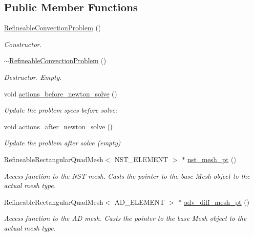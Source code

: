 \subsection*{Public Member Functions}
\begin{DoxyCompactItemize}
\item 
\hyperlink{classRefineableConvectionProblem_a97e661986093402bf55fb6c32b782ddc}{Refineable\+Convection\+Problem} ()
\begin{DoxyCompactList}\small\item\em Constructor. \end{DoxyCompactList}\item 
\hyperlink{classRefineableConvectionProblem_a43fc2693230601928578d5b0c6380943}{$\sim$\+Refineable\+Convection\+Problem} ()
\begin{DoxyCompactList}\small\item\em Destructor. Empty. \end{DoxyCompactList}\item 
void \hyperlink{classRefineableConvectionProblem_a694f0be87fe09a30d94e92acfce85eee}{actions\+\_\+before\+\_\+newton\+\_\+solve} ()
\begin{DoxyCompactList}\small\item\em Update the problem specs before solve\+: \end{DoxyCompactList}\item 
void \hyperlink{classRefineableConvectionProblem_a13bda5e5e75928efa88433902ccab7ee}{actions\+\_\+after\+\_\+newton\+\_\+solve} ()
\begin{DoxyCompactList}\small\item\em Update the problem after solve (empty) \end{DoxyCompactList}\item 
Refineable\+Rectangular\+Quad\+Mesh$<$ N\+S\+T\+\_\+\+E\+L\+E\+M\+E\+NT $>$ $\ast$ \hyperlink{classRefineableConvectionProblem_a9c84adefabe5a9ba08ed946577a19071}{nst\+\_\+mesh\+\_\+pt} ()
\begin{DoxyCompactList}\small\item\em Access function to the N\+ST mesh. Casts the pointer to the base Mesh object to the actual mesh type. \end{DoxyCompactList}\item 
Refineable\+Rectangular\+Quad\+Mesh$<$ A\+D\+\_\+\+E\+L\+E\+M\+E\+NT $>$ $\ast$ \hyperlink{classRefineableConvectionProblem_a6070d18df944a34ce2af1514c30ebea2}{adv\+\_\+diff\+\_\+mesh\+\_\+pt} ()
\begin{DoxyCompactList}\small\item\em Access function to the AD mesh. Casts the pointer to the base Mesh object to the actual mesh type. \end{DoxyCompactList}\item 

\end{DoxyCompactItemize}
